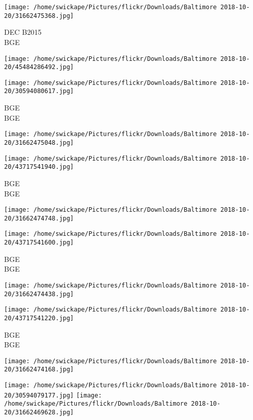 \documentclass[10pt,letterpaper]{article}
\begin{document}
\vspace{0.25in}
\texttt{[image: /home/swickape/Pictures/flickr/Downloads/Baltimore 2018-10-20/31662475368.jpg]}

DEC B2015\\
BGE
\pagebreak

\texttt{[image: /home/swickape/Pictures/flickr/Downloads/Baltimore 2018-10-20/45484286492.jpg]}

\vspace{0.25in}
\texttt{[image: /home/swickape/Pictures/flickr/Downloads/Baltimore 2018-10-20/30594080617.jpg]}

BGE\\
BGE
\pagebreak

\texttt{[image: /home/swickape/Pictures/flickr/Downloads/Baltimore 2018-10-20/31662475048.jpg]}

\vspace{0.25in}
\texttt{[image: /home/swickape/Pictures/flickr/Downloads/Baltimore 2018-10-20/43717541940.jpg]}

BGE\\
BGE
\pagebreak

\texttt{[image: /home/swickape/Pictures/flickr/Downloads/Baltimore 2018-10-20/31662474748.jpg]}

\vspace{0.25in}
\texttt{[image: /home/swickape/Pictures/flickr/Downloads/Baltimore 2018-10-20/43717541600.jpg]}

BGE\\
BGE
\pagebreak

\texttt{[image: /home/swickape/Pictures/flickr/Downloads/Baltimore 2018-10-20/31662474438.jpg]}

\vspace{0.25in}
\texttt{[image: /home/swickape/Pictures/flickr/Downloads/Baltimore 2018-10-20/43717541220.jpg]}

BGE\\
BGE
\pagebreak

\texttt{[image: /home/swickape/Pictures/flickr/Downloads/Baltimore 2018-10-20/31662474168.jpg]}

\vspace{0.25in}
\texttt{[image: /home/swickape/Pictures/flickr/Downloads/Baltimore 2018-10-20/30594079177.jpg]}
\texttt{[image: /home/swickape/Pictures/flickr/Downloads/Baltimore 2018-10-20/31662469628.jpg]}
\end{document}
